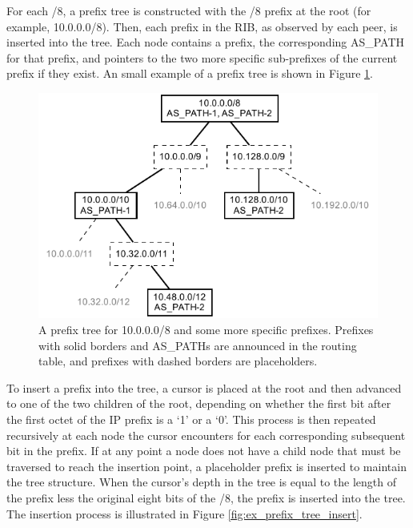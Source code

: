 For each /8, a prefix tree is constructed with the /8 prefix at the root (for example, 10.0.0.0/8). Then, each prefix in the RIB, as observed by each peer, is inserted into the tree. Each node contains a prefix, the corresponding AS\_PATH for that prefix, and pointers to the two more specific sub-prefixes of the current prefix if they exist. An small example of a prefix tree is shown in Figure \ref{fig:ex_prefix_tree}.

\begin{figure}
\begin{center}
    \includegraphics{figures/ex_prefix_tree.pdf}
    \caption[A prefix tree]{A prefix tree for 10.0.0.0/8 and some more specific prefixes. Prefixes with solid borders and AS\_PATHs are announced in the routing table, and prefixes with dashed borders are placeholders.}
    \label{fig:ex_prefix_tree}
\end{center}
\end{figure}

To insert a prefix into the tree, a cursor is placed at the root and then advanced to one of the two children of the root, depending on whether the first bit after the first octet of the IP prefix is a `1' or a `0'. This process is then repeated recursively at each node the cursor encounters for each corresponding subsequent bit in the prefix. If at any point a node does not have a child node that must be traversed to reach the insertion point, a placeholder prefix is inserted to maintain the tree structure. When the cursor's depth in the tree is equal to the length of the prefix less the original eight bits of the /8, the prefix is inserted into the tree. The insertion process is illustrated in Figure \ref{fig:ex_prefix_tree_insert}.


